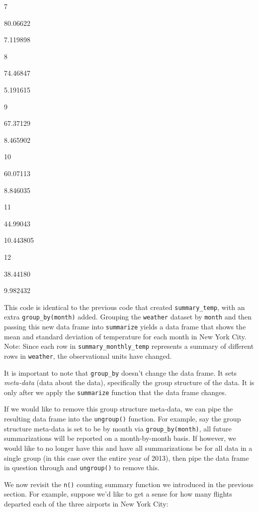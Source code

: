 \documentclass[12pt,]{krantz}
\makeatletter
\newenvironment{Shaded}{\begin{snugshade}}{\end{snugshade}}
\newcommand{\KeywordTok}[1]{\textcolor[rgb]{0.27,0.27,0.27}{\textbf{#1}}}
\newcommand{\DataTypeTok}[1]{\textcolor[rgb]{0.27,0.27,0.27}{#1}}
\newcommand{\StringTok}[1]{\textcolor[rgb]{0.5,0.5,0.5}{#1}}
\newcommand{\OperatorTok}[1]{\textcolor[rgb]{0.43,0.43,0.43}{\textbf{#1}}}
\newcommand{\NormalTok}[1]{#1}
\newenvironment{kframe}{%
\medskip{}
\setlength{\fboxsep}{.8em}
 \def\at@end@of@kframe{}%
 \ifinner\ifhmode%
  \def\at@end@of@kframe{\end{minipage}}%
  \begin{minipage}{\columnwidth}%
 \fi\fi%
 \def\FrameCommand##1{\hskip\@totalleftmargin \hskip-\fboxsep
 \colorbox{shadecolor}{##1}\hskip-\fboxsep
     \hskip-\linewidth \hskip-\@totalleftmargin \hskip\columnwidth}%
 \MakeFramed {\advance\hsize-\width
   \@totalleftmargin\z@ \linewidth\hsize
   \@setminipage}}%
 {\par\unskip\endMakeFramed%
 \at@end@of@kframe}
\renewenvironment{Shaded}{\begin{kframe}}{\end{kframe}}
\makeatother
\begin{document}
7

80.06622

7.119898

8

74.46847

5.191615

9

67.37129

8.465902

10

60.07113

8.846035

11

44.99043

10.443805

12

38.44180

9.982432

This code is identical to the previous code that created
\texttt{summary\_temp}, with an extra \texttt{group\_by(month)} added.
Grouping the \texttt{weather} dataset by \texttt{month} and then passing
this new data frame into \texttt{summarize} yields a data frame that
shows the mean and standard deviation of temperature for each month in
New York City. Note: Since each row in \texttt{summary\_monthly\_temp}
represents a summary of different rows in \texttt{weather}, the
observational units have changed.

It is important to note that \texttt{group\_by} doesn't change the data
frame. It sets \emph{meta-data} (data about the data), specifically the
group structure of the data. It is only after we apply the
\texttt{summarize} function that the data frame changes.

If we would like to remove this group structure meta-data, we can pipe
the resulting data frame into the \texttt{ungroup()} function. For
example, say the group structure meta-data is set to be by month via
\texttt{group\_by(month)}, all future summarizations will be reported on
a month-by-month basis. If however, we would like to no longer have this
and have all summarizations be for all data in a single group (in this
case over the entire year of 2013), then pipe the data frame in question
through and \texttt{ungroup()} to remove this.

We now revisit the \texttt{n()} counting summary function we introduced
in the previous section. For example, suppose we'd like to get a sense
for how many flights departed each of the three airports in New York
City:

\begin{Shaded}
\end{Shaded}
\end{document}

